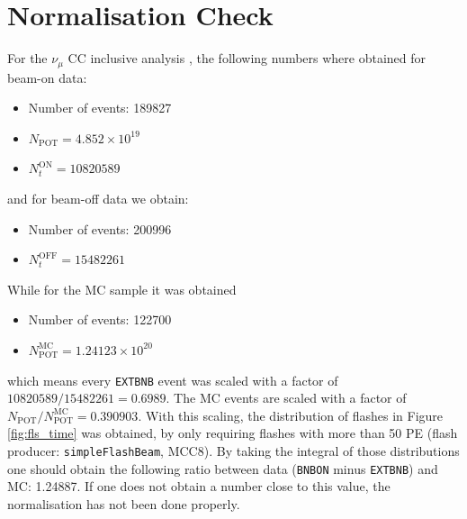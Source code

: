 \documentclass[a4paper, oneside, 12pt, onecolumn]{article}
\newcommand{\extbnb}{\texttt{EXTBNB}\xspace}
\newcommand{\bnbon}{\texttt{BNBON}\xspace}
\begin{document}
\section{Normalisation Check}

For the $\nu_\mu$ CC inclusive analysis \cite{ccinc}, the following numbers where obtained for beam-on data: 
\begin{itemize}
\item Number of events: 189827
\item $N_\text{POT} = 4.852 \times 10^{19}$
\item $N_t^\text{ON} = 10820589$
\end{itemize}
and for beam-off data we obtain:
\begin{itemize}
\item Number of events: 200996
\item $ N_t^\text{OFF} = 15482261$
\end{itemize} 

While for the MC sample it was obtained
\begin{itemize}
\item Number of events: 122700
\item $N_\text{POT}^\text{MC} = 1.24123 \times 10^{20}$
\end{itemize}

which means every \extbnb event was scaled with a factor of $10820589/15482261 = 0.6989$. The MC events are scaled with a factor of $N_\text{POT} / N_\text{POT}^\text{MC} = 0.390903$. With this scaling, the distribution of flashes in Figure \ref{fig:fls_time} was obtained, by only requiring flashes with more than 50 PE (flash producer: \texttt{simpleFlashBeam}, MCC8). By taking the integral of those distributions one should obtain the following ratio between data (\bnbon minus \extbnb) and MC: 1.24887. If one does not obtain a number close to this value, the normalisation has not been done properly. 
\end{document}
